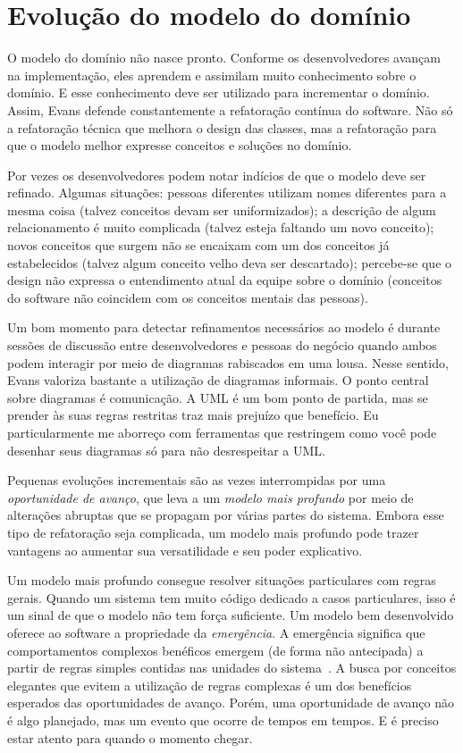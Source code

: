 \documentclass[a4paper, 12pt]{article}
\begin{document}
\section{Evolução do modelo do domínio}

O modelo do domínio não nasce pronto. Conforme os desenvolvedores avançam na implementação, eles aprendem e assimilam muito conhecimento sobre o domínio. E esse conhecimento deve ser utilizado para incrementar o domínio. Assim, Evans defende constantemente a refatoração contínua do software. Não só a refatoração técnica que melhora o design das classes, mas a refatoração para que o modelo melhor expresse conceitos e soluções no domínio.

Por vezes os desenvolvedores podem notar indícios de que o modelo deve ser refinado. Algumas situações: pessoas diferentes utilizam nomes diferentes para a mesma coisa (talvez conceitos devam ser uniformizados); a descrição de algum relacionamento é muito complicada (talvez esteja faltando um novo conceito); novos conceitos que surgem não se encaixam com um dos conceitos já estabelecidos (talvez algum conceito velho deva ser descartado); percebe-se que o design não expressa o entendimento atual da equipe sobre o domínio (conceitos do software não coincidem com os conceitos mentais das pessoas).

Um bom momento para detectar refinamentos necessários ao modelo é durante sessões de discussão entre desenvolvedores e pessoas do negócio quando ambos podem interagir por meio de diagramas rabiscados em uma lousa. Nesse sentido, Evans valoriza bastante a utilização de diagramas informais. O ponto central sobre diagramas é comunicação. A UML é um bom ponto de partida, mas se prender às suas regras restritas traz mais prejuízo que benefício. Eu particularmente me aborreço com ferramentas que restringem como você pode desenhar seus diagramas só para não desrespeitar a UML.

Pequenas evoluções incrementais são as vezes interrompidas por uma \emph{oportunidade de avanço}, que leva a um \emph{modelo mais profundo} por meio de alterações abruptas que se propagam por várias partes do sistema. Embora esse tipo de refatoração seja complicada, um modelo mais profundo pode trazer vantagens ao aumentar sua versatilidade e seu poder explicativo. 

Um modelo mais profundo consegue resolver situações particulares com regras gerais. Quando um sistema tem muito código dedicado a casos particulares, isso é um sinal de que o modelo não tem força suficiente. Um modelo bem desenvolvido oferece ao software a propriedade da \emph{emergência}. A emergência significa que comportamentos complexos benéficos emergem (de forma não antecipada) a partir de regras simples contidas nas unidades do sistema~\cite{37signals2006GettingReal}. A busca por conceitos elegantes que evitem a utilização de regras complexas é um dos benefícios esperados das oportunidades de avanço. Porém, uma oportunidade de avanço não é algo planejado, mas um evento que ocorre de tempos em tempos. E é preciso estar atento para quando o momento chegar.
\end{document}
